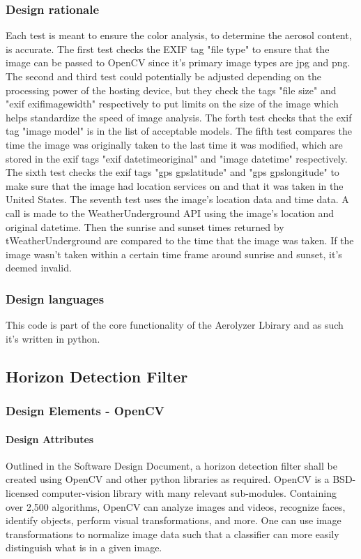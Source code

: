 \documentclass[onecolumn, draftclsnofoot,10pt, compsoc]{IEEEtran}
\begin{document}
\begin{singlespace}
      \subsubsection{Design rationale}
		Each test is meant to ensure the color analysis, to determine the aerosol content, is accurate.
		The first test checks the EXIF tag "file type" to ensure that the image can be passed to OpenCV since it's primary image types are jpg and png.
		The second and third test could potentially be adjusted depending on the processing power of the hosting device, but they check the tags "file size" and "exif exifimagewidth" respectively to put limits on the size of the image which helps standardize the speed of image analysis.
		The forth test checks that the exif tag "image model" is in the list of acceptable models.
		The fifth test compares the time the image was originally taken to the last time it was modified, which are stored in the exif tags "exif datetimeoriginal" and "image datetime" respectively.
		The sixth test checks the exif tags "gps gpslatitude" and "gps gpslongitude" to make sure that the image had location services on and that it was taken in the United States.
		The seventh test uses the image's location data and time data.
		A call is made to the WeatherUnderground API using the image's location and original datetime.
		Then the sunrise and sunset times returned by tWeatherUnderground are compared to the time that the image was taken.
		If the image wasn't taken within a certain time frame around sunrise and sunset, it's deemed invalid.
      \subsubsection{Design languages}
		This code is part of the core functionality of the Aerolyzer Lbirary and as such it's written in python.
	\subsection{Horizon Detection Filter}
      \subsubsection{Design Elements - OpenCV }
      		\paragraph{Design Attributes}
          		Outlined in the Software Design Document, a horizon detection filter shall be created using OpenCV and other python libraries as required.
				OpenCV is a BSD-licensed computer-vision library with many relevant sub-modules.
				Containing over 2,500 algorithms, OpenCV can analyze images and videos, recognize faces, identify objects, perform visual transformations, and more.
				One can use image transformations to normalize image data such that a classifier can more easily distinguish what is in a given image. \cite{svm}


\end{singlespace}
\end{document}
